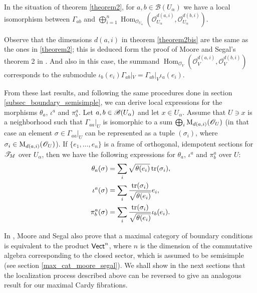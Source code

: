 \begin{theorem}\label{theorem2bis}
In the situation of theorem \ref{theorem2}, for $a,b\in \mathscr{B}(U_\alpha )$ we have a local isomorphism between $\Gamma_{ab}$ and $\bigoplus_{i=1}^n\operatorname{Hom}_{\mathscr{O}_{U_\alpha}}\left (\mathscr{O}_{U_\alpha}^{d(a,i)},\mathscr{O}_{U_\alpha}^{d(b,i)}\right )$.
\end{theorem}

\begin{obs}\label{remark_summands_2}
Observe that the dimensions $d(a,i)$ in theorem \ref{theorem2bis} are the same as the ones in \ref{theorem2}; this is deduced form the proof of Moore and Segal's theorem 2 in \cite{moore_segal1}. And also in this case, the summand $\operatorname{Hom}_{\mathscr{O}_V}\left (\mathscr{O}_V^{d(a,i)},\mathscr{O}_V^{d(b,i)}\right )$ corresponds to the submodule $\iota_b(e_i)\Gamma_{ab}|_V=\Gamma_{ab}|_V\iota_a(e_i)$.
\end{obs}

From these last results, and following the same procedures done in section \ref{subsec_boundary_semisimple}, we can derive local expressions for the morphisms $\theta_a$, $\iota^a$ and $\pi^a_b$. Let $a,b\in \mathscr{B}(U_\alpha)$ and let $x\in U_\alpha$. Assume that $U\ni x$ is a neighborhood such that $\Gamma_{aa}|_U$ is isomorphic to a sum $\bigoplus_i\operatorname{M}_{d(a,i)}(\mathscr{O}_U)$ (in that case an element $\sigma \in \Gamma_{aa}|_U$ can be represented as a tuple $(\sigma_i)$, where $\sigma_i\in \operatorname{M}_{d(a,i)}(\mathscr{O}_U)$). If $\{e_1,\dots ,e_n\}$ is a frame of orthogonal, idempotent sections for $\mathscr{T}_M$ over $U_\alpha$, then we have the following expressions for $\theta_a$, $\iota^a$ and $\pi^a_b$ over $U$:
\begin{equation}\label{local_expressions}
\begin{aligned}
\theta_a (\sigma ) &= \sum_i\sqrt{\theta (e_i)} \operatorname{tr}(\sigma_i), \\
\iota^a(\sigma )   &= \sum_i\frac{\operatorname{tr}(\sigma_i)}{\sqrt{\theta (e_i)}}e_i, \\
\pi_b^a(\sigma )   &= \sum_i\frac{\operatorname{tr}(\sigma_i)}{\sqrt{\theta (e_i)}}\iota_b(e_i). \\
\end{aligned}
\end{equation}

In \cite{moore_segal1}, Moore and Segal also prove that a maximal category of boundary conditions is equivalent to the product $\mathsf{Vect}^n$, where $n$ is the dimension of the commutative algebra corresponding to the closed sector, which is assumed to be semisimple (see section \ref{max_cat_moore_segal}). We shall show in the next sections that the localization process described above can be reversed to give an analogous result for our maximal Cardy fibrations.


